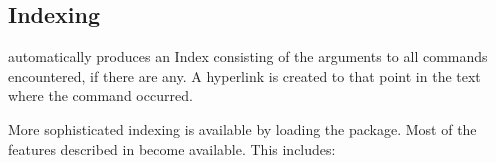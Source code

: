 \subsection{Indexing\label{index}}%
%
\latextohtml{} automatically produces an Index consisting of the
arguments to all  commands encountered, if there are any.
A hyperlink is created to that point in the text where the 
 command occurred.

More sophisticated indexing is available by loading the  package.
Most of the features described in \cite[Appendix~A]{lamp:latex} become available.
This includes:
%
